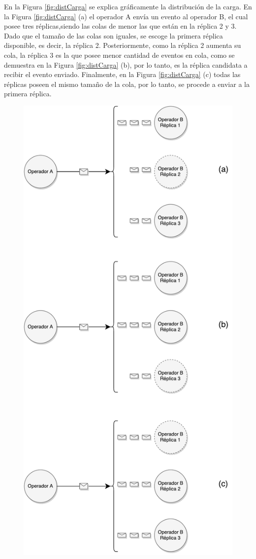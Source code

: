 En la Figura \ref{fig:distCarga} se explica gráficamente la distribución de la carga. En la Figura \ref{fig:distCarga} (a) el operador A envía un evento al operador B, el cual posee tres réplicas,siendo las colas de menor las que están en la réplica 2 y 3. Dado que el tamaño de las colas son iguales, se escoge la primera réplica disponible, es decir, la réplica 2. Posteriormente, como la réplica 2 aumenta su cola, la réplica 3 es la que posee menor cantidad de eventos en cola, como se demuestra en la Figura \ref{fig:distCarga} (b), por lo tanto, es la réplica candidata a recibir el evento enviado. Finalmente, en la Figura \ref{fig:distCarga} (c) todas las réplicas poseen el mismo tamaño de la cola, por lo tanto, se procede a enviar a la primera réplica.

\begin{figure}[!ht]
	\centering
		\includegraphics[scale=0.45]{images/DistribucionCarga.pdf}

\end{figure}
